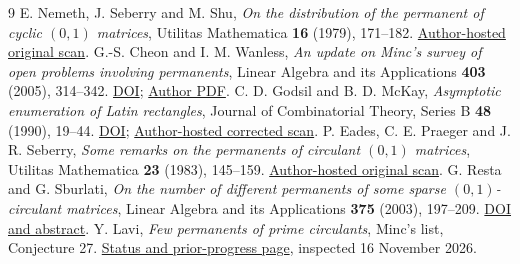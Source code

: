 \documentclass[11pt,a4paper]{article}
\begin{document}
\clearpage
\begin{thebibliography}{9}
 E. Nemeth, J. Seberry and M. Shu,
\emph{On the distribution of the permanent of cyclic $(0,1)$ matrices},
Utilitas Mathematica \textbf{16} (1979), 171--182.
\href{https://documents.uow.edu.au/~jennie/WEBPDF/071_1979.pdf}{Author-hosted original scan}.
 G.-S. Cheon and I. M. Wanless,
\emph{An update on Minc's survey of open problems involving permanents},
Linear Algebra and its Applications \textbf{403} (2005), 314--342.
\href{https://doi.org/10.1016/j.laa.2005.02.030}{DOI};
\href{https://users.monash.edu.au/~iwanless/papers/permsurveyLAA.pdf}{Author PDF}.
 C. D. Godsil and B. D. McKay,
\emph{Asymptotic enumeration of Latin rectangles},
Journal of Combinatorial Theory, Series B \textbf{48} (1990), 19--44.
\href{https://doi.org/10.1016/0095-8956(90)90128-M}{DOI};
\href{https://users.cecs.anu.edu.au/~bdm/papers/LatinRectangles.pdf}{Author-hosted corrected scan}.
 P. Eades, C. E. Praeger and J. R. Seberry,
\emph{Some remarks on the permanents of circulant $(0,1)$ matrices},
Utilitas Mathematica \textbf{23} (1983), 145--159.
\href{https://documents.uow.edu.au/~jennie/WEBPDF/092_1983.pdf}{Author-hosted original scan}.
 G. Resta and G. Sburlati,
\emph{On the number of different permanents of some sparse $(0,1)$-circulant matrices},
Linear Algebra and its Applications \textbf{375} (2003), 197--209.
\href{https://doi.org/10.1016/S0024-3795(03)00649-9}{DOI and abstract}.
 Y. Lavi,
\emph{Few permanents of prime circulants}, Minc's list, Conjecture 27.
\href{https://yair-lavi.com/mincs-list/conjecture-27/index.html}{Status and prior-progress page}, inspected 16 November 2026.
\end{thebibliography}
\end{document}
